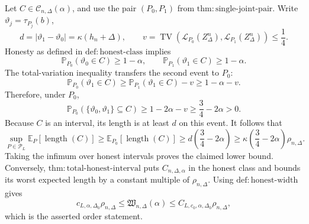 Let \(C\in\mathcal C_{n,\Delta}(\alpha)\), and use the pair \((P_0,P_1)\) from \(\mathrm{thm:single\text{-}joint\text{-}pair}\).  Write \(\vartheta_j=\tau_{P_j}(b)\),
\[
 d=|\vartheta_1-\vartheta_0|=\kappa(h_n+\Delta),
 \qquad
 v=\operatorname{TV}(\mathcal L_{P_0}(Z_\Delta^n),\mathcal L_{P_1}(Z_\Delta^n))\le\frac14.
\]
Honesty as defined in \(\mathrm{def:honest\text{-}class}\) implies
\[
 \mathbb P_{P_0}(\vartheta_0\in C)\ge1-\alpha,
 \qquad
 \mathbb P_{P_1}(\vartheta_1\in C)\ge1-\alpha.
\]
The total-variation inequality transfers the second event to \(P_0\):
\[
 \mathbb P_{P_0}(\vartheta_1\in C)
 \ge\mathbb P_{P_1}(\vartheta_1\in C)-v
 \ge1-\alpha-v.
\]
Therefore, under \(P_0\),
\[
 \mathbb P_{P_0}(\{\vartheta_0,\vartheta_1\}\subseteq C)
 \ge1-2\alpha-v
 \ge\frac34-2\alpha>0.
\]
Because \(C\) is an interval, its length is at least \(d\) on this event.  It follows that
\[
 \sup_{P\in\mathcal P_L}\mathbb E_P[\operatorname{length}(C)]
 \ge\mathbb E_{P_0}[\operatorname{length}(C)]
 \ge d\left(\frac34-2\alpha\right)
 \ge\kappa\left(\frac34-2\alpha\right)\rho_{n,\Delta}.
\]
Taking the infimum over honest intervals proves the claimed lower bound.  Conversely, \(\mathrm{thm:total\text{-}honest\text{-}interval}\) puts \(C_{n,\Delta,\alpha}\) in the honest class and bounds its worst expected length by a constant multiple of \(\rho_{n,\Delta}\).  Using \(\mathrm{def:honest\text{-}width}\) gives
\[
 c_{L,\alpha,\Delta_0}\rho_{n,\Delta}
 \le\mathfrak W_{n,\Delta}(\alpha)
 \le C_{L,c_0,\alpha,\Delta_0}\rho_{n,\Delta},
\]
which is the asserted order statement.